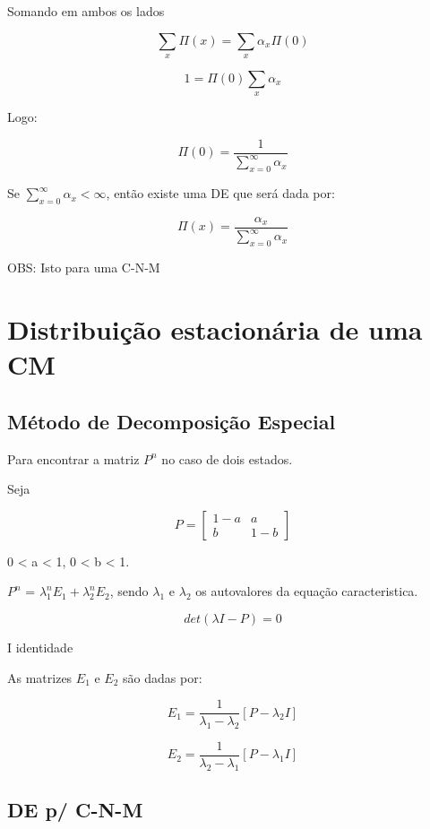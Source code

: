 \documentclass[]{article}
\theoremstyle{definition}
\theoremstyle{definition}
\theoremstyle{definition}
\theoremstyle{remark}
\begin{document}
Somando em ambos os lados

\[\sum_x \Pi(x) = \sum_x \alpha_x \Pi(0)\]

\[1 = \Pi(0) \sum_x \alpha_x\]

Logo:

\[\Pi(0) = \frac{1}{\sum_{x=0}^{\infty} \alpha_x}\]

Se \(\sum_{x=0}^{\infty} \alpha_x < \infty\), então existe uma DE que
será dada por:

\[\Pi(x) = \frac{\alpha_x}{\sum_{x=0}^{\infty}\alpha_x}\]

OBS: Isto para uma C-N-M

\section{Distribuição estacionária de uma
CM}\label{distribuicao-estacionaria-de-uma-cm-1}

\subsection{Método de Decomposição
Especial}\label{metodo-de-decomposicao-especial}

Para encontrar a matriz \(P^n\) no caso de dois estados.

Seja

\begin{equation}
P = \begin{bmatrix}
1 - a & a \\
b &  1-b
\end{bmatrix}
\end{equation}

0 \textless{} a \textless{} 1, 0 \textless{} b \textless{} 1.

\(P^n\) = \(\lambda_1^n E_1 + \lambda_2^n E_2\), sendo \(\lambda_1\) e
\(\lambda_2\) os autovalores da equação caracteristica.

\[det(\lambda I-P) = 0\]

I identidade

As matrizes \(E_1\) e \(E_2\) são dadas por:

\[E_1 = \frac{1}{\lambda_1 - \lambda_2} [P - \lambda_2I]\]

\[E_2 = \frac{1}{\lambda_2 - \lambda_1} [P - \lambda_1I]\]

\subsection{DE p/ C-N-M}\label{de-p-c-n-m}
\end{document}
